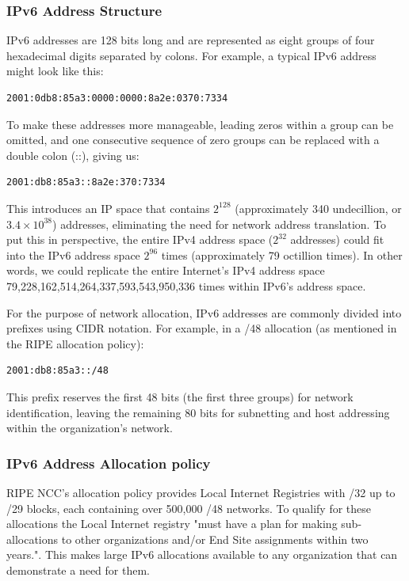 \documentclass[12pt]{article}
\begin{document}
\subsubsection{IPv6 Address Structure}
IPv6 addresses are 128 bits long and are represented as eight groups of four hexadecimal digits separated by colons.
For example, a typical IPv6 address might look like this:
\begin{verbatim}
2001:0db8:85a3:0000:0000:8a2e:0370:7334
\end{verbatim}
To make these addresses more manageable, leading zeros within a group can be omitted, 
and one consecutive sequence of zero groups can be replaced with a double colon (::), giving us:
\begin{verbatim}
2001:db8:85a3::8a2e:370:7334
\end{verbatim}
This introduces an IP space that contains $2^{128}$ (approximately 340 undecillion, or $3.4 \times 10^{38}$) addresses, 
eliminating the need for network address translation. 
To put this in perspective, the entire IPv4 address space ($2^{32}$ addresses) could fit into the IPv6 address space $2^{96}$ times 
(approximately 79 octillion times).
In other words, we could replicate the entire Internet's IPv4 address space 79,228,162,514,264,337,593,543,950,336 times within IPv6's address space.

\noindent For the purpose of network allocation, IPv6 addresses are commonly divided into prefixes using CIDR notation. 
For example, in a /48 allocation (as mentioned in the RIPE allocation policy):
\begin{verbatim}
2001:db8:85a3::/48
\end{verbatim}
This prefix reserves the first 48 bits (the first three groups) for network identification, 
leaving the remaining 80 bits for subnetting and host addressing within the organization's network.
\subsubsection{IPv6 Address Allocation policy}
RIPE NCC's allocation policy provides Local Internet Registries with /32 up to /29 blocks, each containing over 500,000 /48 networks.
To qualify for these allocations the Local Internet registry 
"must have a plan for making sub-allocations to other organizations and/or End Site assignments within two years."\cite{IPv6AddressAllocation}.
This makes large IPv6 allocations available to any organization that can demonstrate a need for them.
\end{document}

